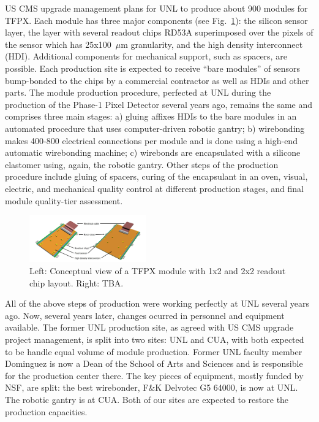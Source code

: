 US CMS upgrade management plans for UNL to produce about 900 modules for TFPX. Each module has three major components (see Fig.~\ref{fig:TFPXmodule}): the silicon sensor layer, the layer with several readout chips RD53A superimposed over the pixels of the sensor which has 25x100~$\mu$m granularity, and the high density interconnect (HDI). Additional components for mechanical support, such as spacers, are possible. Each production site is expected to receive ``bare modules'' of sensors bump-bonded to the chips by a commercial contractor as well as HDIs and other parts. The module production procedure, perfected at UNL during the production of the Phase-1 Pixel Detector several years ago, remains the same and comprises three main stages: a) gluing affixes HDIs to the bare modules in an automated procedure that uses computer-driven robotic gantry; b) wirebonding makes 400-800 electrical connections per module and is done using a high-end automatic wirebonding machine; c) wirebonds are encapsulated with a silicone elastomer using, again, the robotic gantry. Other steps of the production procedure include gluing of spacers, curing of the encapsulant in an oven, visual, electric, and mechanical quality control at different production stages, and final module quality-tier assessment. 

\begin{figure}
\centering\includegraphics[width=0.45\textwidth]{figs/phase2_pixel_module_lowres.png}
\caption{\label{fig:TFPXmodule} Left: Conceptual view of a TFPX module with 1x2 and 2x2 readout chip layout. Right: TBA.}
\end{figure}

All of the above steps of production were working perfectly at UNL several years ago. Now, several years later, changes ocurred in personnel and equipment available. The former UNL production site, as agreed with US CMS upgrade project management, is split into two sites: UNL and CUA, with both expected to be handle equal volume of module production. Former UNL faculty member Dominguez is now a Dean of the School of Arts and Sciences and is responsible for the production center there. The key pieces of equipment, mostly funded by NSF, are split: the best wirebonder, F\&K Delvotec G5 64000, is now at UNL. The robotic gantry is at CUA. Both of our sites are expected to restore the production capacities. 

